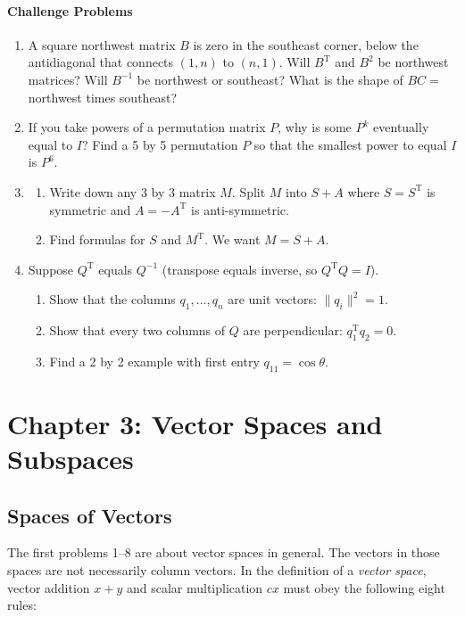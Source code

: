 \documentclass[14pt, a4paper]{article}
\begin{document}
\paragraph{Challenge Problems}
\begin{enumerate}[resume]
    \item A square northwest matrix $B$ is zero in the southeast corner, below the antidiagonal that connects $(1,n)$ to $(n,1)$. Will $B^{\mathrm{T}}$ and $B^2$ be northwest matrices? Will $B^{-1}$ be northwest or southeast? What is the shape of $BC =$ northwest times southeast?

    \item If you take powers of a permutation matrix $P$, why is some $P^k$ eventually equal to $I$? Find a 5 by 5 permutation $P$ so that the smallest power to equal $I$ is $P^6$.

    \item
          \begin{enumerate}
              \item Write down any 3 by 3 matrix $M$. Split $M$ into $S + A$ where $S = S^{\mathrm{T}}$ is symmetric and $A = -A^{\mathrm{T}}$ is anti-symmetric.
              \item Find formulas for $S$ and $M^{\mathrm{T}}$. We want $M = S + A$.
          \end{enumerate}

    \item Suppose $Q^{\mathrm{T}}$ equals $Q^{-1}$ (transpose equals inverse, so $Q^{\mathrm{T}}Q = I$).
          \begin{enumerate}
              \item Show that the columns $q_1,\dots,q_n$ are unit vectors: $\|q_i\|^2 = 1$.
              \item Show that every two columns of $Q$ are perpendicular: $q_1^{\mathrm{T}}q_2 = 0$.
              \item Find a 2 by 2 example with first entry $q_{11} = \cos\theta$.
          \end{enumerate}
\end{enumerate}

\newpage

\section{Chapter 3: Vector Spaces and Subspaces}

\subsection{Spaces of Vectors}
\noindent The first problems 1--8 are about vector spaces in general. The vectors in those spaces are not necessarily column vectors. In the definition of a \textit{vector space}, vector addition $x+y$ and scalar multiplication $cx$ must obey the following eight rules:
\end{document}

